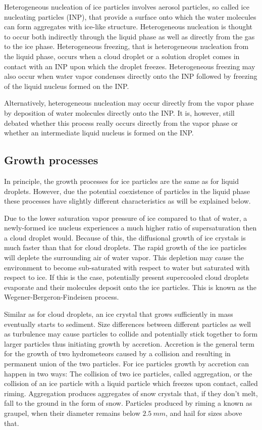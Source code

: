 Heterogeneous nucleation of ice particles involves aerosol particles, so called
ice nucleating particles (INP), that provide a surface onto which the water
molecules can form aggregates with ice-like structure. Heterogeneous nucleation
is thought to occur both indirectly through the liquid phase as well as directly
from the gas to the ice phase. Heterogeneous freezing, that is heterogeneous
nucleation from the liquid phase, occurs when a cloud droplet or a solution
droplet comes in contact with an INP upon which the droplet freezes.
Heterogeneous freezing may also occur when water vapor condenses directly onto
the INP followed by freezing of the liquid nucleus formed on the INP.

Alternatively, heterogeneous nucleation may occur directly from the vapor phase
by deposition of water molecules directly onto the INP. It is, however, still
debated whether this process really occurs directly from the vapor phase or whether
an intermediate liquid nucleus is formed on the INP.

\subsection{Growth processes}

In principle, the growth processes for ice particles are the same as for liquid
droplets. However, due the potential coexistence of particles in the liquid
phase these processes have slightly different characteristics as will be
explained below.

Due to the lower saturation vapor pressure of ice compared to that of water, a
newly-formed ice nucleus experiences a much higher ratio of supersaturation then
a cloud droplet would. Because of this, the diffusional growth of ice crystals
is much faster than that for cloud droplets. The rapid growth of the ice
particles will deplete the surrounding air of water vapor. This depletion may
cause the environment to become sub-saturated with respect to water but
saturated with respect to ice. If this is the case, potentially present supercooled
cloud droplets evaporate and their molecules deposit onto the ice particles. This is
known as the Wegener-Bergeron-Findeisen process.

Similar as for cloud droplets, an ice crystal that grows sufficiently in mass
eventually starts to sediment. Size differences between different particles as
well as turbulence may cause particles to collide and potentially stick together
to form larger particles thus initiating growth by accretion. Accretion is the
general term for the growth of two hydrometeors caused by a collision and
resulting in permanent union of the two particles. For ice particles growth by
accretion can happen in two ways: The collision of two ice particles, called
aggregation, or the collision of an ice particle with a liquid particle which
freezes upon contact, called riming. Aggregation produces aggregates of
snow crystals that, if they don't melt, fall to the ground in the form of snow.
Particles produced by riming a known as graupel, when their diameter remains below
$2.5\ \unit{mm}$, and hail for sizes above that.

